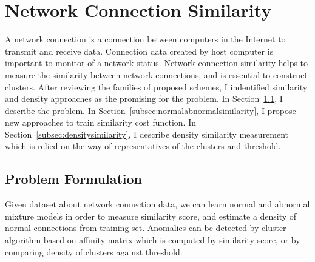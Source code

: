 \section{Network Connection Similarity}
\label{sec:connectionsimilarity}
A network connection is a connection between computers in the Internet to transmit and receive data. 
Connection data created by host computer is important to monitor of a network status.
Network connection similarity helps to measure the similarity between network connections, and is essential to construct clusters. 
After reviewing the families of proposed schemes, I indentified similarity and density approaches as the promising for the problem.
\newline
In Section~\ref{subsec:problemformulation}, I describe the problem.\newline
In Section~\ref{subsec:normalabnormalsimilarity}, I propose new approaches to train similarity cost function.\newline
In Section~\ref{subsec:densitysimilarity}, I describe density similarity measurement which is relied on the way of representatives of the clusters and threshold.\newline
\subsection{Problem Formulation}
\label{subsec:problemformulation}
Given dataset about network connection data, we can learn normal and abnormal mixture models in order to measure similarity score, and estimate a density of normal connections from training set.
Anomalies can be detected by cluster algorithm based on affinity matrix which is computed by similarity score, or by comparing density of clusters against threshold.

